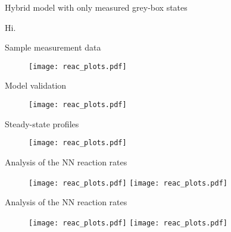 \documentclass[xcolor=dvipsnames, 8pt]{beamer} %
\begin{document}
\begin{frame}{Hybrid model with only measured grey-box states}

	Hi.

\end{frame}

\begin{frame}{Sample measurement data}

\begin{figure}
	\centering
	\texttt{[image: reac\_plots.pdf]}
\end{figure}

\end{frame}

\begin{frame}{Model validation}

\begin{figure}
	\centering
	\texttt{[image: reac\_plots.pdf]}
\end{figure}

\end{frame}


\begin{frame}{Steady-state profiles}
	
	\begin{figure}
		\centering
		\texttt{[image: reac\_plots.pdf]}
	\end{figure}
	
\end{frame}

\begin{frame}{Analysis of the NN reaction rates}

	\begin{figure}
		\centering
		\texttt{[image: reac\_plots.pdf]}
		\texttt{[image: reac\_plots.pdf]}
	\end{figure}

\end{frame}

\begin{frame}{Analysis of the NN reaction rates}
	
	\begin{figure}
		\centering
		\texttt{[image: reac\_plots.pdf]}
		\texttt{[image: reac\_plots.pdf]}
	\end{figure}
	
\end{frame}
\end{document}
